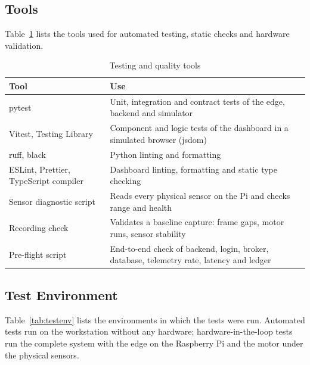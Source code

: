 \subsection{Tools}

Table~\ref{tab:testtools} lists the tools used for automated testing, static checks and hardware validation.

\begin{table}[htbp]
\centering
\caption{Testing and quality tools}
\label{tab:testtools}
\small
\begin{tabularx}{\textwidth}{@{}l X@{}}
\toprule
\textbf{Tool} & \textbf{Use} \\
\midrule
pytest & Unit, integration and contract tests of the edge, backend and simulator \\
Vitest, Testing Library & Component and logic tests of the dashboard in a simulated browser (jsdom) \\
ruff, black & Python linting and formatting \\
ESLint, Prettier, TypeScript compiler & Dashboard linting, formatting and static type checking \\
Sensor diagnostic script & Reads every physical sensor on the Pi and checks range and health \\
Recording check & Validates a baseline capture: frame gaps, motor runs, sensor stability \\
Pre-flight script & End-to-end check of backend, login, broker, database, telemetry rate, latency and ledger \\
\bottomrule
\end{tabularx}
\end{table}

\subsection{Test Environment}

Table~\ref{tab:testenv} lists the environments in which the tests were run. Automated tests run on the workstation without any hardware; hardware-in-the-loop tests run the complete system with the edge on the Raspberry Pi and the motor under the physical sensors.

